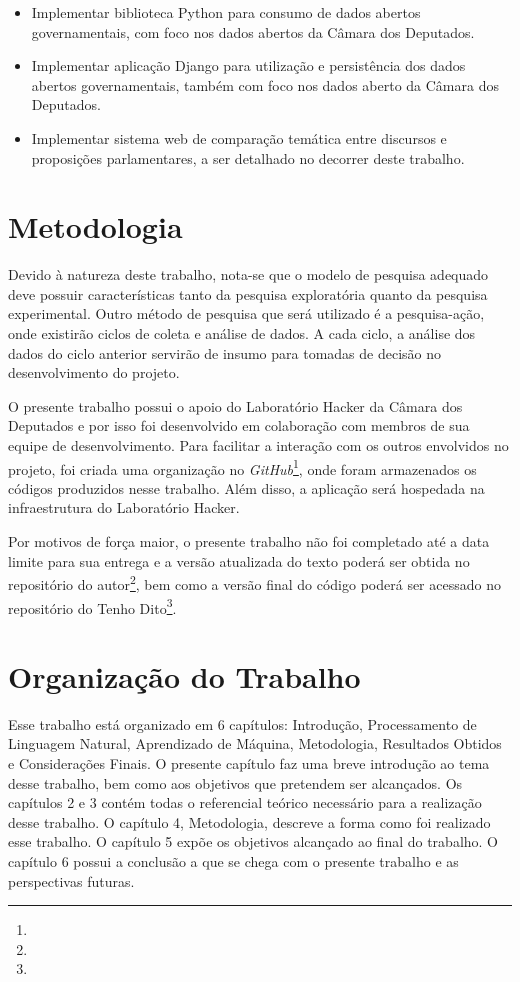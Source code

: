 \begin{itemize}
    \item Implementar biblioteca Python para consumo de dados abertos governamentais, com foco nos dados abertos da Câmara dos Deputados.
    \item Implementar aplicação Django para utilização e persistência dos dados abertos governamentais, também com foco nos dados aberto da Câmara dos Deputados.
    \item Implementar sistema web de comparação temática entre discursos e proposições parlamentares, a ser detalhado no decorrer deste trabalho.
\end{itemize}

\section{Metodologia}
\label{sub:metodologia}

Devido à natureza deste trabalho, nota-se que o modelo de pesquisa adequado deve possuir características tanto da pesquisa exploratória quanto da pesquisa experimental. Outro método de pesquisa que será utilizado é a pesquisa-ação, onde existirão ciclos de coleta e análise de dados. A cada ciclo, a análise dos dados do ciclo anterior servirão de insumo para tomadas de decisão no desenvolvimento do projeto.

O presente trabalho possui o apoio do Laboratório Hacker da Câmara dos Deputados e por isso foi desenvolvido em colaboração com membros de sua equipe de desenvolvimento. Para facilitar a interação com os outros envolvidos no projeto, foi criada uma organização no \textit{GitHub}\footnote{}, onde foram armazenados os códigos produzidos nesse trabalho. Além disso, a aplicação será hospedada na infraestrutura do Laboratório Hacker.

Por motivos de força maior, o presente trabalho não foi completado até a data limite para sua entrega e a versão atualizada do texto poderá ser obtida no repositório do autor\footnote{}, bem como a versão final do código poderá ser acessado no repositório do Tenho Dito\footnote{}.

\section{Organização do Trabalho}
\label{sec:organização_do_trabalho}

Esse trabalho está organizado em 6 capítulos: Introdução, Processamento de Linguagem Natural, Aprendizado de Máquina, Metodologia, Resultados Obtidos e Considerações Finais. O presente capítulo faz uma breve introdução ao tema desse trabalho, bem como aos objetivos que pretendem ser alcançados. Os capítulos 2 e 3 contém todas o referencial teórico necessário para a realização desse trabalho. O capítulo 4, Metodologia, descreve a forma como foi realizado esse trabalho. O capítulo 5 expõe os objetivos alcançado ao final do trabalho. O capítulo 6 possui a conclusão a que se chega com o presente trabalho e as perspectivas futuras.
